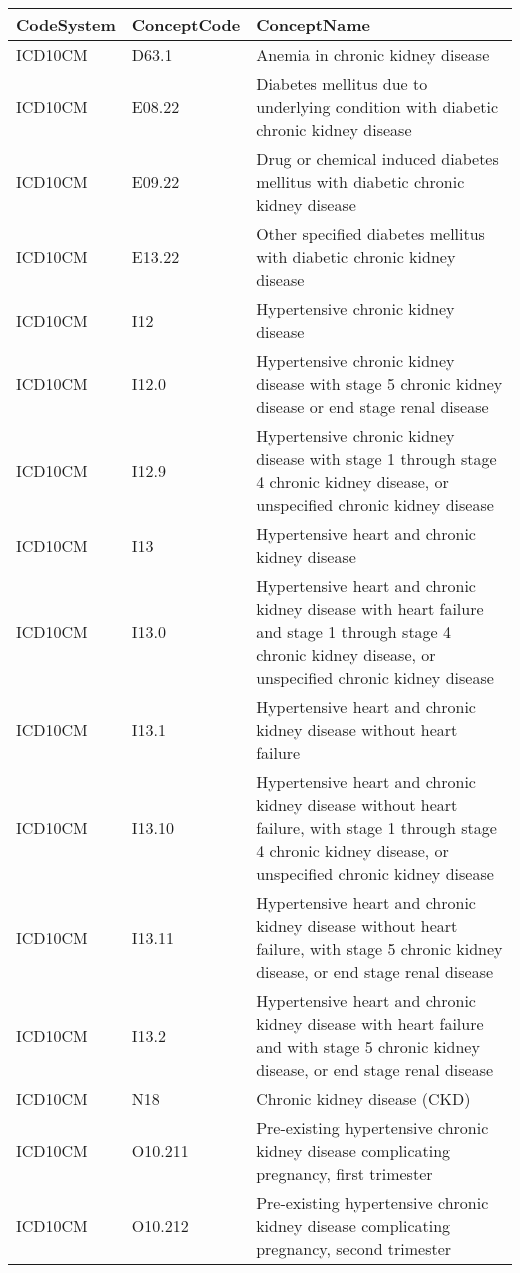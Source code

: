 \begin{table}[ht]
\centering
\begin{tabular}{lll}
  \hline
CodeSystem & ConceptCode & ConceptName \\ 
  \hline
ICD10CM & D63.1 & Anemia in chronic kidney disease \\ 
  ICD10CM & E08.22 & Diabetes mellitus due to underlying condition with diabetic chronic kidney disease \\ 
  ICD10CM & E09.22 & Drug or chemical induced diabetes mellitus with diabetic chronic kidney disease \\ 
  ICD10CM & E13.22 & Other specified diabetes mellitus with diabetic chronic kidney disease \\ 
  ICD10CM & I12 & Hypertensive chronic kidney disease \\ 
  ICD10CM & I12.0 & Hypertensive chronic kidney disease with stage 5 chronic kidney disease or end stage renal disease \\ 
  ICD10CM & I12.9 & Hypertensive chronic kidney disease with stage 1 through stage 4 chronic kidney disease, or unspecified chronic kidney disease \\ 
  ICD10CM & I13 & Hypertensive heart and chronic kidney disease \\ 
  ICD10CM & I13.0 & Hypertensive heart and chronic kidney disease with heart failure and stage 1 through stage 4 chronic kidney disease, or unspecified chronic kidney disease \\ 
  ICD10CM & I13.1 & Hypertensive heart and chronic kidney disease without heart failure \\ 
  ICD10CM & I13.10 & Hypertensive heart and chronic kidney disease without heart failure, with stage 1 through stage 4 chronic kidney disease, or unspecified chronic kidney disease \\ 
  ICD10CM & I13.11 & Hypertensive heart and chronic kidney disease without heart failure, with stage 5 chronic kidney disease, or end stage renal disease \\ 
  ICD10CM & I13.2 & Hypertensive heart and chronic kidney disease with heart failure and with stage 5 chronic kidney disease, or end stage renal disease \\ 
  ICD10CM & N18 & Chronic kidney disease (CKD) \\ 
  ICD10CM & O10.211 & Pre-existing hypertensive chronic kidney disease complicating pregnancy, first trimester \\ 
  ICD10CM & O10.212 & Pre-existing hypertensive chronic kidney disease complicating pregnancy, second trimester \\ 

\end{tabular}
\end{table}
